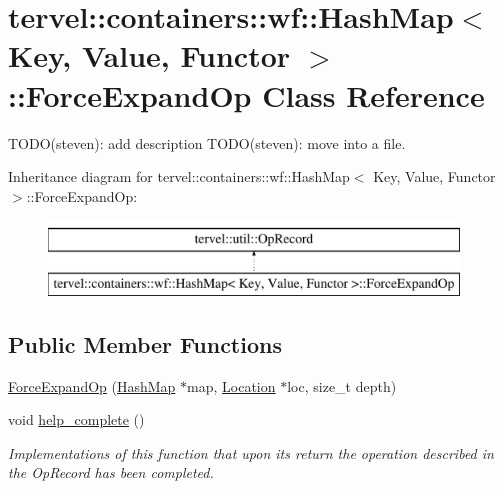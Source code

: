 \hypertarget{classtervel_1_1containers_1_1wf_1_1_hash_map_1_1_force_expand_op}{}\section{tervel\+:\+:containers\+:\+:wf\+:\+:Hash\+Map$<$ Key, Value, Functor $>$\+:\+:Force\+Expand\+Op Class Reference}
\label{classtervel_1_1containers_1_1wf_1_1_hash_map_1_1_force_expand_op}


T\+O\+D\+O(steven)\+: add description T\+O\+D\+O(steven)\+: move into a file.  


Inheritance diagram for tervel\+:\+:containers\+:\+:wf\+:\+:Hash\+Map$<$ Key, Value, Functor $>$\+:\+:Force\+Expand\+Op\+:\begin{figure}[H]
\begin{center}
\leavevmode
\includegraphics[height=2.000000cm]{classtervel_1_1containers_1_1wf_1_1_hash_map_1_1_force_expand_op}
\end{center}
\end{figure}
\subsection*{Public Member Functions}
\begin{DoxyCompactItemize}
\item 
\hyperlink{classtervel_1_1containers_1_1wf_1_1_hash_map_1_1_force_expand_op_aa7213b3c1c5d4216eabc96771542f59c}{Force\+Expand\+Op} (\hyperlink{classtervel_1_1containers_1_1wf_1_1_hash_map}{Hash\+Map} $\ast$map, \hyperlink{classtervel_1_1containers_1_1wf_1_1_hash_map_ab2c04cbf19034689a795208e0108fe8a}{Location} $\ast$loc, size\+\_\+t depth)
\item 
void \hyperlink{classtervel_1_1containers_1_1wf_1_1_hash_map_1_1_force_expand_op_adfe48adab3158c1e81119a2ff369e3d8}{help\+\_\+complete} ()
\begin{DoxyCompactList}\small\item\em Implementations of this function that upon its return the operation described in the Op\+Record has been completed. \end{DoxyCompactList}\end{DoxyCompactItemize}
